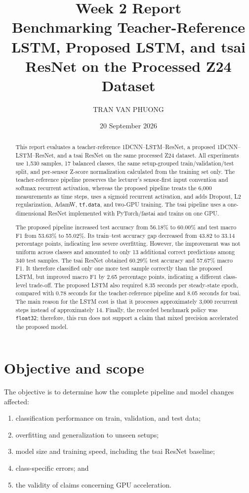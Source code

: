 \documentclass[11pt,a4paper]{article}
\title{
    \textbf{Week 2 Report}\\[0.4em]
    Benchmarking Teacher-Reference LSTM, Proposed LSTM, and tsai ResNet
    on the Processed Z24 Dataset
}
\author{TRAN VAN PHUONG}
\date{20 September 2026}
\begin{document}
\maketitle

\begin{abstract}
This report evaluates a teacher-reference 1DCNN--LSTM--ResNet, a proposed
1DCNN--LSTM--ResNet, and a tsai ResNet on the same processed Z24 dataset.
All experiments use 1,530 samples, 17 balanced classes, the same
setup-grouped train/validation/test split, and per-sensor Z-score normalization
calculated from the training set only. The teacher-reference pipeline preserves
the lecturer's sensor-first input convention and softmax recurrent activation,
whereas the proposed pipeline treats the 6,000 measurements as time steps,
uses a sigmoid recurrent activation, and adds Dropout, L2 regularization,
AdamW, \texttt{tf.data}, and two-GPU training. The tsai pipeline uses a
one-dimensional ResNet implemented with PyTorch/fastai and trains on one GPU.

The proposed pipeline increased test accuracy from 56.18\% to 60.00\% and
test macro F1 from 53.63\% to 55.02\%. Its train--test accuracy gap decreased
from 43.82 to 33.14 percentage points, indicating less severe overfitting.
However, the improvement was not uniform across classes and amounted to only
13 additional correct predictions among 340 test samples. The tsai ResNet
obtained 60.29\% test accuracy and 57.67\% macro F1. It therefore classified
only one more test sample correctly than the proposed LSTM, but improved macro
F1 by 2.65 percentage points, indicating a different class-level trade-off.
The proposed LSTM
also required 8.35 seconds per steady-state epoch, compared with 0.78 seconds
for the teacher-reference pipeline and 8.05 seconds for tsai. The main reason
for the LSTM cost is that it processes
approximately 3,000 recurrent steps instead of approximately 14. Finally, the
recorded benchmark policy was \texttt{float32}; therefore, this run does not
support a claim that mixed precision accelerated the proposed model.
\end{abstract}

\section{Objective and scope}

The objective is to determine how the complete pipeline and model changes
affected:

\begin{enumerate}
    \item classification performance on train, validation, and test data;
    \item overfitting and generalization to unseen setups;
    \item model size and training speed, including the tsai ResNet baseline;
    \item class-specific errors; and
    \item the validity of claims concerning GPU acceleration.
\end{enumerate}
\end{document}
